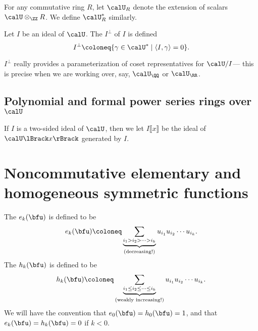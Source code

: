 \documentclass{article}
\newcommand{\ip}[1]{
    \left\langle
        {#1}
    \right\rangle
}
\begin{document}
\begin{definition}
    For any commutative ring $R$, let $\calU_R$ denote the extension of scalars $\calU \otimes_\ZZ R$.
    We define $\calU^\ast_R$ similarly.
\end{definition}

\begin{definition}
    Let $I$ be an ideal of $\calU$. 
    The  $I^\perp$ of $I$ is defined
    \[
        I^\perp
        \coloneq
        \{
            \gamma \in \calU^\ast
            \mid
            \ip{I, \gamma} = 0
        \}.
    \]
\end{definition}

$I^\perp$ really provides a parameterization of coset representatives for $\calU/I$--- this is precise when we are working over, say, $\calU_\QQ$ or $\calU_\RR$.

\subsection{Polynomial and formal power series rings over $\calU$}

\begin{definition}
    If $I$ is a two-sided ideal of $\calU$, then we let $I\lBrack x \rBrack$ be the ideal of $\calU \lBrack x \rBrack$ generated by $I$.
\end{definition}

\section{
    Noncommutative elementary and homogeneous symmetric functions
}

\begin{definition}
    The  $e_k(\bfu)$ is defined to be
    \begin{equation}
        \label{eqn:ncElementaryDef}
        e_k(\bfu)
        \coloneq
        \underbrace{
            \sum_{i_1 > i_2 > \cdots > i_k}
        }_{\text{(decreasing!)}}
        u_{i_1} u_{i_2} \cdots u_{i_k}. 
    \end{equation}
    The  $h_k(\bfu)$ is defined to be
    \begin{equation}
        \label{eqn:ncHomogeneousDef}
        h_k(\bfu)
        \coloneq
        \underbrace{
            \sum_{i_1 \leq i_2 \leq \cdots \leq i_k}
        }_{\text{(weakly increasing!)}}
        u_{i_1} u_{i_2} \cdots u_{i_k}. 
    \end{equation}
    We will have the convention that $e_0(\bfu) = h_0(\bfu) = 1$, and that $e_k(\bfu) = h_k(\bfu) = 0$ if $k < 0$.
\end{definition}
\end{document}
